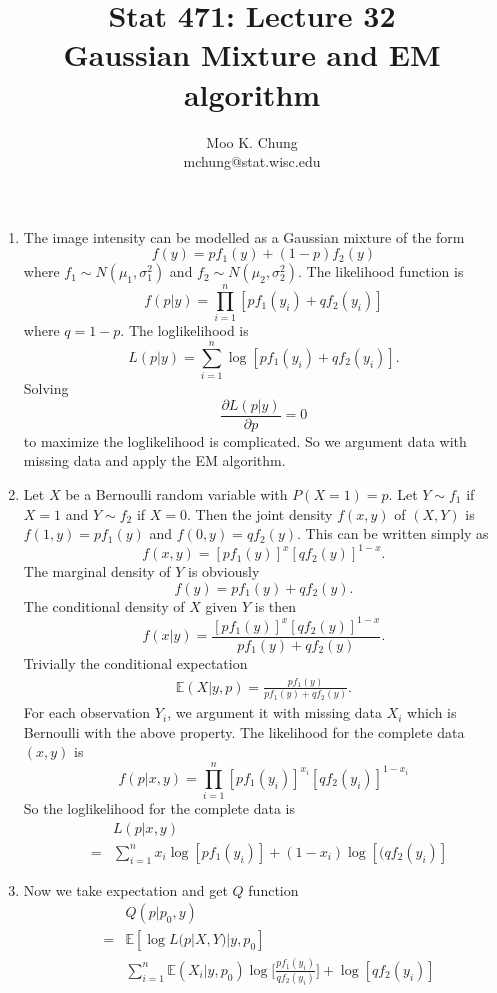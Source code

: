 \documentclass[12pt,twocolumn]{article} %
\newcommand{\bqn}{\begin{eqnarray*}}
\newcommand{\eqn}{\end{eqnarray*}}
\newcommand{\bq}{\begin{eqnarray}}
\newcommand{\eq}{\end{eqnarray}}
\begin{document}
\title{Stat 471: Lecture 32\\
Gaussian Mixture and EM algorithm}
\author{Moo K. Chung\\
mchung@stat.wisc.edu}
\maketitle \thispagestyle{empty}



\begin{enumerate}

\item The image intensity can be modelled as a Gaussian mixture of
the form
$$f(y) = p f_1(y) + (1-p)f_2(y)$$ where $f_1 \sim N(\mu_1,\sigma_1^2)$ and $f_2 \sim
N(\mu_2,\sigma_2^2)$. The likelihood function is
$$f(p|y)=\prod_{i=1}^n [pf_1(y_i)+qf_2(y_i)]$$
where $q=1-p$. The loglikelihood is
$$L(p|y) = \sum_{i=1}^n \log[pf_1(y_i)+qf_2(y_i)].$$
Solving
$$\frac{\partial L(p|y)}{\partial p}=0$$
to maximize the loglikelihood is complicated. So we argument data
with missing data and apply the EM algorithm.

\item Let $X$ be a Bernoulli random variable with $P(X=1)=p$. Let
$Y \sim f_1$ if $X=1$ and $Y \sim f_2$ if $X=0$. Then the joint
density $f(x,y)$ of $(X,Y)$ is $f(1,y) = pf_1(y)$ and
$f(0,y)=qf_2(y)$. This can be written simply as
$$f(x,y) = [pf_1(y)]^x[qf_2(y)]^{1-x}.$$
The marginal density of $Y$ is obviously
$$f(y) = pf_1(y) + qf_2(y).$$
The conditional density of $X$ given $Y$ is then
$$f(x|y) = \frac{[pf_1(y)]^x[qf_2(y)]^{1-x}}{ pf_1(y) + qf_2(y)}.
$$
Trivially the conditional expectation \bq\mathbb{E}(X|y,p) =
\frac{pf_1(y)}{pf_1(y) + qf_2(y)}.\label{eq:32-1}\eq
 For each observation $Y_i$, we argument it with missing data
$X_i$ which is Bernoulli with the above property. The likelihood
for the complete data $(x,y)$ is
$$f(p|x,y) = \prod_{i=1}^n [pf_1(y_i)]^{x_i}[qf_2(y_i)]^{1-x_i}$$
So the loglikelihood for the complete data is
\bqn &&L(p|x,y)\\
 &=& \sum_{i=1}^n x_i\log [p f_1(y_i)]
 + (1-x_i)\log[(qf_2(y_i)] \eqn

\item Now we take expectation and get $Q$ function
\bqn & &Q(p|p_0,y)\\
 &=&\mathbb{E}[\log L(p|X,Y)|y,p_0]\\
&&\sum_{i=1}^n \mathbb{E}(X_i|y,p_0)
\log[\frac{pf_1(y_i)}{qf_2(y_i)}\Big]
 +\log [qf_2(y_i)] \eqn


\end{enumerate}
\end{document}
